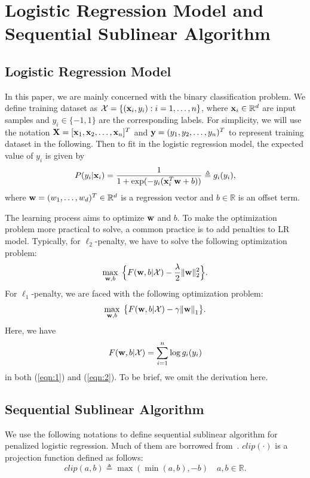 \documentclass[10pt, conference, compsocconf]{IEEEtran}
\newcommand{\bw}{\mathbf{w}}
\newcommand{\lc}{\left(}
\newcommand{\rc}{\right)}
\def\X{{\bf X}}
\def\x{{\bf x}}
\def\y{{\bf y}}
\def\w{{\bf w}}
\def\XM{{\mathcal X}}
\def\RB{{\mathbb R}}
\begin{document}
\section{Logistic Regression Model and Sequential Sublinear Algorithm} \label{sec:plr}

\subsection{Logistic Regression Model}
In this paper, we are mainly concerned with the binary classification problem.  	
We define training dataset as $\XM=\{(\x_i, y_i): i=1, \ldots, n\}$, where $\x_i \in \RB^d$ are input samples and $y_i \in \{-1, 1\}$ are the corresponding labels.
For simplicity, we will use the notation $\X=[{\x}_{1}, {\x}_{2}, \ldots, {\x}_n]^{T}$ and $\y=(y_1, y_2, \ldots, y_n)^T$ to represent training dataset in the following.
Then to fit in the logistic regression model, the expected value of $y_i$ is given by
\[
P(y_i|\x_i)= \frac{1}{1+ \exp(- y_i(\x_i^T \w + b))} \triangleq g_i(y_i),
\]
where $\w=(w_1, \ldots, w_d)^T \in \RB^d$ is a regression vector and $b\in \RB$ is an offset term.

The learning process aims to optimize $\w$ and $b$.
To make the optimization problem more practical to solve, a common practice is to add penalties to LR model.
Typically, for $\ell_2$-penalty, we have to solve the following optimization problem:
\begin{equation} \label{eqn:1}
	\max_{\bw ,b} \; \Big\{F(\w, b| \XM) - \frac{\lambda}{2}  \|\bw\|_2^{2} \Big\}.
\end{equation}
For $\ell_1$-penalty, we are faced with the following optimization problem:
\begin{equation} \label{eqn:2}
	\max_{\bw ,b} \;  \big\{F(\w, b|\XM)- \gamma{\|\bw \|}_{1}\big\}.	
\end{equation}
Here, we have
\[
F(\w, b| \XM) = \sum_{i=1}^n \log g_i(y_i)
\]
in both (\ref{eqn:1}) and (\ref{eqn:2}).
To be brief, we omit the derivation here.

\subsection{Sequential Sublinear Algorithm}
We use the following notations to define sequential sublinear algorithm for penalized logistic regression.
Much of them are borrowed from~\cite{peng2012sublinear}.
$clip\lc \cdot \rc$ is a projection function defined as follows:
\[
clip\lc a,b \rc \triangleq \max \lc \min \lc a,b \rc ,-b\rc \,\,\,\,\,\, a,b \in \mathbb{R}.
\]
\end{document}
